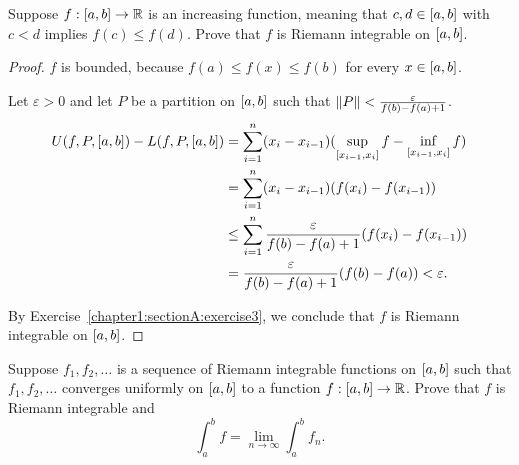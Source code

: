 \begin{exercise}\label{chapter1:sectionA:exercise13}
    Suppose $f: \left[{a, b}\right]\to\mathbb{R}$ is an increasing function, meaning that $c, d\in\left[{a, b}\right]$ with $c < d$ implies $f(c)\leq f(d)$. Prove that $f$ is Riemann integrable on $\left[{a, b}\right]$.
\end{exercise}

\begin{proof}
    $f$ is bounded, because $f(a) \leq f(x) \leq f(b)$ for every $x\in\left[{a, b}\right]$.

    Let $\varepsilon > 0$ and let $P$ be a partition on $\left[{a, b}\right]$ such that $\left\Vert{P}\right\Vert < \frac{\varepsilon}{f(b) - f(a) + 1}$.
    \begin{align*}
        U(f, P, \left[{a, b}\right]) - L(f, P, \left[{a, b}\right]) & = \sum^{n}_{i=1}(x_{i} - x_{i-1})(\sup\limits_{\left[{x_{i-1},x_{i}}\right]}f - \inf\limits_{\left[{x_{i-1},x_{i}}\right]}f) \\
                                                                        & = \sum^{n}_{i=1}(x_{i} - x_{i-1})(f(x_{i}) - f(x_{i-1}))                                                                         \\
                                                                        & \leq \sum^{n}_{i=1}\frac{\varepsilon}{f(b) - f(a) + 1}(f(x_{i}) - f(x_{i-1}))                                                    \\
                                                                        & = \frac{\varepsilon}{f(b) - f(a) + 1}(f(b) - f(a)) < \varepsilon.
    \end{align*}

    By Exercise~\ref{chapter1:sectionA:exercise3}, we conclude that $f$ is Riemann integrable on $\left[{a, b}\right]$.
\end{proof}
\newpage

\begin{exercise}\label{chapter1:sectionA:exercise13}
    Suppose $f_{1}, f_{2}, \ldots$ is a sequence of Riemann integrable functions on $\left[{a,b}\right]$ such that $f_{1}, f_{2}, \ldots$ converges uniformly on $\left[{a,b}\right]$ to a function $f: \left[{a,b}\right]\to\mathbb{R}$. Prove that $f$ is Riemann integrable and
    \[
        \int^{b}_{a}f = \lim\limits_{n\to\infty}\int^{b}_{a}f_{n}.
    \]
\end{exercise}

